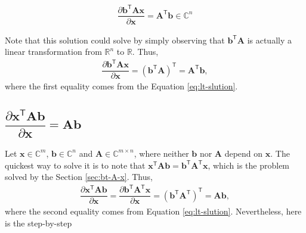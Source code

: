 \documentclass{article}
\newcommand{\trans}{\mathsf{T}}
\begin{document}
\begin{align}
    \boxed{\dfrac{\partial \mathbf{b}^\trans \mathbf{A} \mathbf{x}}{\partial \mathbf{x}} = \mathbf{A}^\trans \mathbf{b} \in \mathbb{C}^{n}}
\end{align}

Note that this solution could solve by simply observing that \(\mathbf{\mathbf{b}^\trans \mathbf{A}}\) is actually a linear transformation from \(\mathbb{R}^{n}\) to \(\mathbb{R}\). Thus,
\begin{align}
    \dfrac{\partial \mathbf{b}^\trans \mathbf{A} \mathbf{x}}{\partial \mathbf{x}} = \left( \mathbf{b}^\trans \mathbf{A} \right)^{\trans} = \mathbf{A}^\trans \mathbf{b},
\end{align}
where the first equality comes from the Equation \eqref{eq:lt-slution}.

\subsection{\(\dfrac{\partial \mathbf{x}^\trans \mathbf{A} \mathbf{b}}{\partial \mathbf{x}} = \mathbf{Ab}\)}
Let \(\mathbf{x} \in \mathbb{C}^{m}\), \(\mathbf{b} \in \mathbb{C}^{n}\) and \(\mathbf{A}\in \mathbb{C}^{m\times n}\), where neither \(\mathbf{b}\) nor \(\mathbf{A}\) depend on \(\mathbf{x}\). The quickest way to solve it is to note that \(\mathbf{x}^\trans \mathbf{A} \mathbf{b} =  \mathbf{b}^\trans \mathbf{A}^\trans \mathbf{x}\), which is the problem solved by the Section \ref{sec:bt-A-x}. Thus,
\begin{align}
    \dfrac{\partial \mathbf{x}^\trans \mathbf{A} \mathbf{b}}{\partial \mathbf{x}} = \dfrac{\partial \mathbf{b}^\trans \mathbf{A}^\trans \mathbf{x}}{\partial \mathbf{x}} = \left( \mathbf{b}^\trans \mathbf{A}^\trans \right)^{\trans} = \mathbf{A} \mathbf{b},
\end{align}
where the second equality comes from Equation \eqref{eq:lt-slution}. Nevertheless, here is the step-by-step
\end{document}

